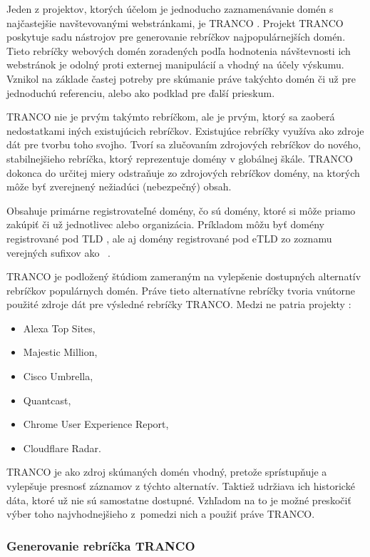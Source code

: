 Jeden z projektov, ktorých účelom je jednoducho zaznamenávanie domén s najčastejšie navštevovanými webstránkami, je TRANCO \cite{tranco}.
Projekt TRANCO poskytuje sadu nástrojov pre generovanie rebríčkov najpopulárnejších domén. 
Tieto rebríčky webových domén zoradených podľa hodnotenia návštevnosti ich webstránok je odolný proti externej manipulácií a vhodný na účely výskumu. 
Vznikol na základe častej potreby pre skúmanie práve takýchto domén či už pre jednoduchú referenciu, alebo ako podklad pre ďalší prieskum.

TRANCO nie je prvým takýmto rebríčkom, ale je prvým, ktorý sa zaoberá nedostatkami iných existujúcich rebríčkov.
Existujúce rebríčky využíva ako zdroje dát pre tvorbu toho svojho.
Tvorí sa zlučovaním zdrojových rebríčkov do nového, stabilnejšieho rebríčka, ktorý reprezentuje domény v globálnej škále.
TRANCO dokonca do určitej miery odstraňuje zo zdrojových rebríčkov domény, na ktorých môže byť zverejnený nežiadúci (nebezpečný) obsah.

Obsahuje primárne registrovateľné domény, čo sú domény, ktoré si môže priamo zakúpiť či už jednotlivec alebo organizácia. 
Príkladom môžu byť domény registrované pod TLD , ale aj domény registrované pod eTLD zo zoznamu verejných sufixov ako \mbox{ \cite{tranco}}.

\pagebreak

TRANCO je podložený štúdiom zameraným na vylepšenie dostupných alternatív rebríčkov populárnych domén.
Práve tieto alternatívne rebríčky tvoria vnútorne použité zdroje dát pre výsledné rebríčky TRANCO.
Medzi ne patria projekty \cite{tranco-config}:
\begin{itemize}
    \item Alexa Top Sites,
    \item Majestic Million,
    \item Cisco Umbrella,
    \item Quantcast,
    \item Chrome User Experience Report,
    \item Cloudflare Radar.
\end{itemize}
TRANCO je ako zdroj skúmaných domén vhodný, pretože sprístupňuje a vylepšuje presnosť záznamov z týchto alternatív.
Taktiež udržiava ich historické dáta, ktoré už nie sú samostatne dostupné.
Vzhľadom na to je možné preskočiť výber toho najvhodnejšieho \mbox{z pomedzi} nich a použiť práve TRANCO.

\subsubsection{Generovanie rebríčka TRANCO}
\label{tranco-generation}

